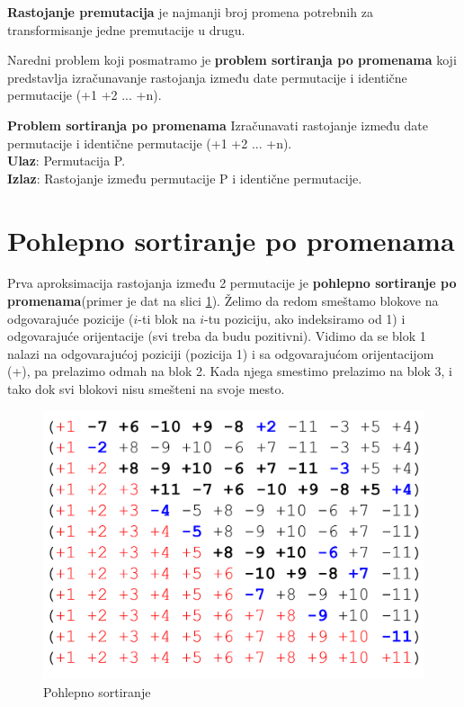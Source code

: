 \begin{definicija}{\textbf{Rastojanje premutacija} je najmanji broj promena potrebnih za transformisanje jedne premutacije u drugu.}
\end{definicija}

\noindent Naredni problem koji posmatramo je \textbf{problem sortiranja po promenama} koji predstavlja izračunavanje rastojanja između date permutacije i identične permutacije (+1 +2 ... +n).

\begin{tcolorbox}
	\textbf{Problem sortiranja po promenama} Izračunavati rastojanje između date permutacije i identične permutacije (+1 +2 ... +n). \\
	\textbf{Ulaz}: Permutacija P. \\
	\textbf{Izlaz}: Rastojanje između permutacije P i identične permutacije.
\end{tcolorbox}


\section{Pohlepno sortiranje po promenama}

Prva aproksimacija rastojanja između 2 permutacije je \textbf{pohlepno sortiranje po promenama}(primer je dat na slici \ref{slika:pohlepno}). Želimo da redom smeštamo blokove na odgovarajuće pozicije ($i$-ti blok na $i$-tu poziciju, ako indeksiramo od 1) i odgovarajuće orijentacije (svi treba da budu pozitivni). Vidimo da se blok 1 nalazi na odgovarajućoj poziciji (pozicija 1) i sa odgovarajućom orijentacijom (+), pa prelazimo odmah na blok 2. Kada njega smestimo prelazimo na blok 3, i tako dok svi blokovi nisu smešteni na svoje mesto.

\begin{figure}[h!]
\centering
\includegraphics[scale=0.4]{poglavlja/6/slike/greedy_sort.png}
\caption{Pohlepno sortiranje}
\label{slika:pohlepno}
\end{figure}


